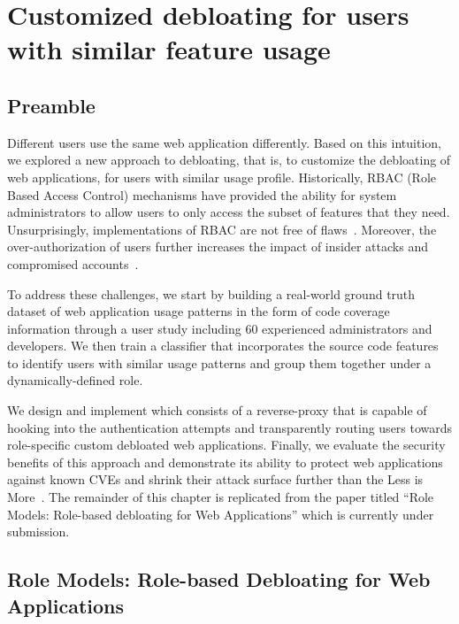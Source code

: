 \chapter{Customized debloating for users with similar feature usage}
\label{chap:dbltr}

\section*{Preamble}
Different users use the same web application differently. 
Based on this intuition, we explored a new approach to debloating, that is, to customize the debloating of web applications, for users with similar usage profile. 
Historically, RBAC (Role Based Access Control) mechanisms have provided the ability for system administrators to allow users to only access the subset of features that they need. 
Unsurprisingly, implementations of RBAC are not free of flaws~\cite{doupe2011fear, dalton2009nemesis, wpfilemanager}. 
Moreover, the over-authorization of users further increases the impact of insider attacks and compromised accounts~\cite{twitterviphack, oktahack}.

To address these challenges, we start by building a real-world ground truth dataset of web application usage patterns in the form of code coverage information through a user study including 60 experienced administrators and developers. 
We then train a classifier that incorporates the source code features to identify users with similar usage patterns and group them together under a dynamically-defined role. 

We design and implement \dbltr{} which consists of a reverse-proxy that is capable of hooking into the authentication attempts and transparently routing users towards role-specific custom debloated web applications. 
Finally, we evaluate the security benefits of this approach and demonstrate its ability to protect web applications against known CVEs and shrink their attack surface further than the Less is More~\cite{azad2019less}. 
The remainder of this chapter is replicated from the paper titled ``Role Models: Role-based debloating for Web Applications'' which is currently under submission. 

\section*{Role Models: Role-based Debloating for Web Applications}

